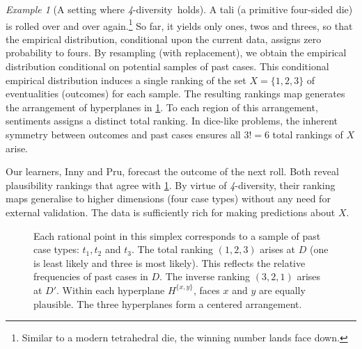 \documentclass[ecta,nameyear,draft]{econsocart}
\newcommand{\fourdiv}{\textit{4}-\textup{diversity}}
\theoremstyle{plain}
\theoremstyle{remark}
\newtheorem{example}{Example}%
\begin{document}
\begin{example}[A setting where \fourdiv\ holds]\label{eg-tali}
  A tali (a primitive four-sided die) is rolled over and over
  again.\footnote{Similar to a modern tetrahedral die, the winning number lands
  face down.} So far, it yields only ones, twos and threes, so that the
  empirical distribution, conditional upon the current data, assigns zero
  probability to fours. By resampling (with replacement), we obtain the
  empirical distribution conditional on potential samples of past cases. This
  conditional empirical distribution induces a single ranking of the set
  $X=\{1, 2, 3\}$ of eventualities (outcomes) for each sample. The resulting
  rankings map generates the arrangement of hyperplanes in \cref{fig-tali}.  To
  each region of this arrangement, {sentiments} assigns a distinct
  total ranking.  
  In dice-like problems, the inherent symmetry between outcomes and past cases
  ensures all $3!=6$ total rankings of $X$ arise.
 
  Our learners, Inny and {Pru}, forecast the outcome of the next roll.  Both
  reveal plausibility rankings that agree with \cref{fig-tali}. By virtue of
  \fourdiv, their ranking maps generalise to higher dimensions (four case
  types) without any need for external validation. The data is sufficiently
  rich for making predictions about $X$.
\end{example}
\begin{figure}
  \centering 

  \caption{\label{fig-tali} Each rational point in this simplex corresponds to
    a sample of past case types: $t_1, t_2$ and $t_3$.  The total ranking $(1,
    2, 3)$ arises at $D$ (one is least likely and three is most likely). This
    reflects the relative frequencies of past cases in $D$.  The inverse
    ranking $(3, 2, 1)$ arises at $D'$. Within each hyperplane $H^{\{x, y\}}$,
    faces $x$ and $y$ are equally plausible.  The three hyperplanes form a
    centered arrangement.}
\end{figure}
\end{document}
